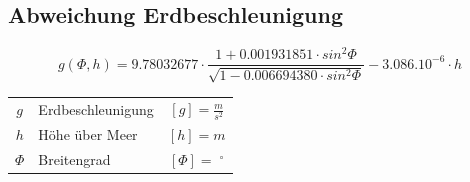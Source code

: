 	\subsection{Abweichung Erdbeschleunigung}

		$$ \boxed{ g(\varPhi , h) = 9.78032677 \cdot \frac{1 + 0.001931851 \cdot sin^2 \varPhi}{\sqrt{1 - 0.006694380 \cdot sin^2 \varPhi}} - 3.086.10^{-6} \cdot h }$$ 

		\begin{tabular}{c l c}
			$g$ & Erdbeschleunigung & $[g] = \frac{m}{s^2}$ \\
			$h$ & Höhe über Meer & $[h] = m$ \\
			$\varPhi$ & Breitengrad & $[\varPhi] =  \; ^\circ$ \\
		\end{tabular}

		